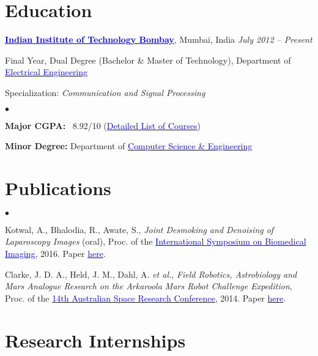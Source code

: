 \documentclass[margin,line]{res}
\newenvironment{list1}{
  \begin{list}{\ding{113}}{%
      \setlength{\itemsep}{0in}
      \setlength{\parsep}{0in} \setlength{\parskip}{0in}
      \setlength{\topsep}{0in} \setlength{\partopsep}{0in} 
      \setlength{\leftmargin}{0.17in}}}{\end{list}}
\newenvironment{list2}{
  \begin{list}{$\bullet$}{%
      \setlength{\itemsep}{0in}
      \setlength{\parsep}{0in} \setlength{\parskip}{0in}
      \setlength{\topsep}{0in} \setlength{\partopsep}{0in} 
      \setlength{\leftmargin}{0.2in}}}{\end{list}}
\begin{document}
\begin{resume}
\section{\sc Education}
{\bf \href{http://www.iitb.ac.in/}{\textcolor{blue}{Indian Institute of Technology Bombay}}}, Mumbai, India \hfill {\it July 2012 -- Present} \\
\vspace*{-.1in}
\begin{list1}
\item[] Final Year, Dual Degree (Bachelor \& Master of Technology), Department of \href{http://www.ee.iitb.ac.in/}{\textcolor{blue}{Electrical Engineering}}
\item[] Specialization: {\em Communication and Signal Processing}
\begin{list2}
\vspace*{.05in}
\item \textbf{Major CGPA:}  \ 8.92/10 (\hyperlink{crselst}{\textcolor{blue}{Detailed List of Courses}})
\item \textbf{Minor Degree:}  Department of \href{http://www.cse.iitb.ac.in/}{\textcolor{blue}{Computer Science \& Engineering}}
\end{list2}
\end{list1}

\section{\sc Publications}
\begin{list2}
\item Kotwal, A., Bhalodia, R., Awate, S., {\em Joint Desmoking and Denoising of Laparoscopy Images} (oral), Proc. of the \href{http://biomedicalimaging.org/2016/}{\textcolor{blue} {International Symposium on Biomedical Imaging}}, 2016. Paper \href{http://alankarkotwal.github.io/pubs/lap-dehazing.pdf}{\textcolor{blue} {here}}.
\item Clarke, J. D. A., Held, J. M., Dahl, A. {\em et al.}, {\em Field Robotics, Astrobiology and Mars Analogue Research on the Arkaroola Mars Robot Challenge Expedition}, Proc. of the \href{http://www.nssa.com.au/14asrc/14ASRC-proceedings.zip}{\textcolor{blue} {14th Australian Space Research Conference}}, 2014. Paper \href{http://alankarkotwal.github.io/pubs/Arkaroola.pdf}{\textcolor{blue} {here}}.
\end{list2}

\section{\sc Research Internships} 


\end{resume}
\end{document}
